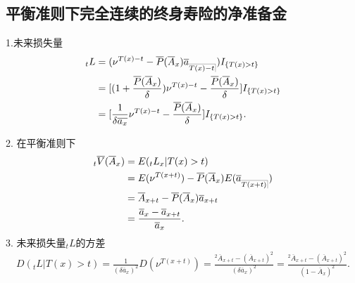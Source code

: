 \documentclass[lang=cn,10pt]{elegantbook}
\makeatletter
\DeclareRobustCommand{\annu}[1]{_{%
    \def\arraystretch{0}%
    \setlength\arraycolsep{1pt}%
    \setlength\arrayrulewidth{.2pt}%
    \begin{array}[b]{@{}c|}\hline
        \\[\arraycolsep]%
        \scriptstyle #1%
    \end{array}%
}}
\makeatother
\begin{document}
\subsection{平衡准则下完全连续的终身寿险的净准备金}
\begin{proposition}
    1.未来损失量
    \begin{align*}
        {}_tL & =(\nu^{T(x)-t}-\overline{P}( \overline{A}_x )\overline a_{\annu {T(x)-t}})I_{\{T(x)>t\}}                                        \\
              & = [(1+\frac{\overline{P}( \overline{A}_x )}{\delta})\nu^{T(x)-t}-\frac{\overline{P}( \overline{A}_x )}{\delta} ] I_{\{T(x)>t\}} \\
              & = [\frac{1}{\delta\overline{a_x}}\nu^{T(x)-t}-\frac{\overline{P}( \overline{A}_x )}{\delta} ]I_{\{T(x)>t\}}.
    \end{align*}

    2. 在平衡准则下
    \begin{align*}
        {}_t\overline V(\overline A_x) & =E({}_tL_x|T(x)>t)                                                             \\
                                       & =E(\nu^{T(x+t)})-\overline{P}( \overline{A}_x )E(\overline a_{\annu {T(x+t)}}) \\
                                       & =\overline A_{x+t}-\overline{P}( \overline{A}_x )\overline a_{x+t}             \\
                                       & =\frac{\overline a_x-\overline a_{x+t}}{\overline a_x}.
    \end{align*}
    3. 未来损失量$_tL$的方差
    \begin{align*}
        D(_tL|T(x)>t) =\frac{1}{(\delta\overline a_x)^2}D(\nu^{T(x+t)})=\frac{^2\overline A_{x+t}-(\overline A_{x+t})^2}{(\delta\overline a_x)^2}=\frac{^2\overline A_{x+t}-(\overline A_{x+t})^2}{(1-\overline{A}_x)^2}.
    \end{align*}
\end{proposition}
\end{document}
